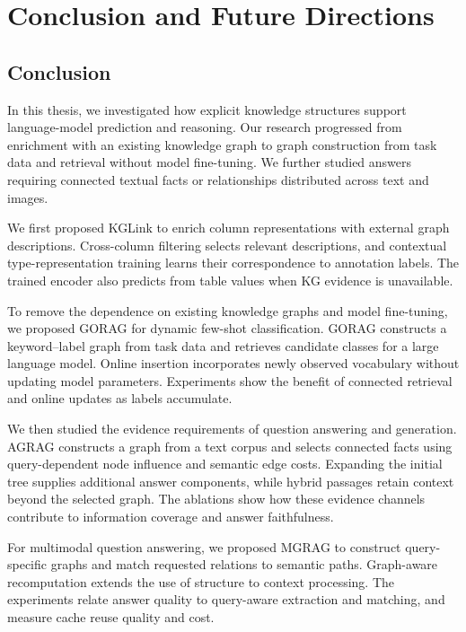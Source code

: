 \chapter{Conclusion and Future Directions}
\label{ch:conclusion}

\section{Conclusion}
\label{sec:conclusion:findings}
In this thesis, we investigated how explicit knowledge structures support language-model prediction and reasoning. Our research progressed from enrichment with an existing knowledge graph to graph construction from task data and retrieval without model fine-tuning. We further studied answers requiring connected textual facts or relationships distributed across text and images.

We first proposed KGLink to enrich column representations with external graph descriptions. Cross-column filtering selects relevant descriptions, and contextual type-representation training learns their correspondence to annotation labels. The trained encoder also predicts from table values when KG evidence is unavailable.

To remove the dependence on existing knowledge graphs and model fine-tuning, we proposed GORAG for dynamic few-shot classification. GORAG constructs a keyword--label graph from task data and retrieves candidate classes for a large language model. Online insertion incorporates newly observed vocabulary without updating model parameters. Experiments show the benefit of connected retrieval and online updates as labels accumulate.

We then studied the evidence requirements of question answering and generation. AGRAG constructs a graph from a text corpus and selects connected facts using query-dependent node influence and semantic edge costs. Expanding the initial tree supplies additional answer components, while hybrid passages retain context beyond the selected graph. The ablations show how these evidence channels contribute to information coverage and answer faithfulness.

For multimodal question answering, we proposed MGRAG to construct query-specific graphs and match requested relations to semantic paths. Graph-aware recomputation extends the use of structure to context processing. The experiments relate answer quality to query-aware extraction and matching, and measure cache reuse quality and cost.


